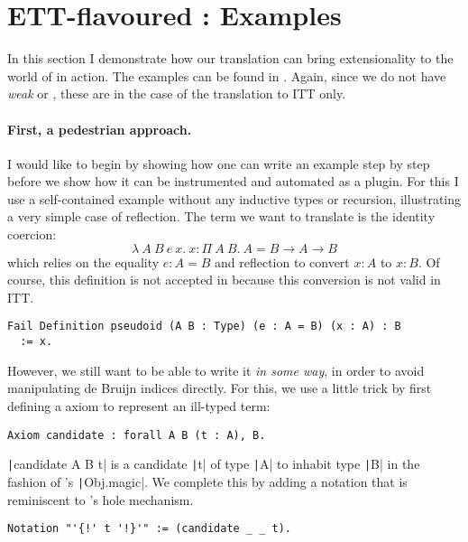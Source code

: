 \section{ETT-flavoured \Coq: Examples}

In this section I demonstrate how our translation can bring extensionality to
the world of \Coq in action. The examples can be found in
.
Again, since we do not have \emph{weak} \Coq or \MetaCoq, these are in the case
of the translation to \acrshort{ITT} only.

\paragraph{First, a pedestrian approach.}
%
I would like to begin by showing how one can write an example step by step
before we show how it can be instrumented and automated as a plugin.
For this I use a self-contained example without any inductive
types or recursion, illustrating a very simple case of reflection.
The term we want to translate is the identity coercion:
\[
  \lambda\ A\ B\ e\ x.\ x : \Pi\ A\ B.\ A = B \to
  A \to B
\]
which relies on the equality \(e : A = B\) and reflection to convert  \(x : A\)
to \(x : B\).
%
Of course, this definition is not accepted in \Coq because this
conversion is not valid in \acrshort{ITT}.
%
\begin{verbatim}
Fail Definition pseudoid (A B : Type) (e : A = B) (x : A) : B
  := x.
\end{verbatim}
%
However, we still want to be able to write it \emph{in some way}, in order to
avoid manipulating de Bruijn indices directly.
%
For this, we use a little trick by first defining a \Coq axiom to represent
an ill-typed term:
%
\begin{verbatim}
Axiom candidate : forall A B (t : A), B.
\end{verbatim}
%
\texttt|candidate A B t| is a candidate \texttt|t| of type
\texttt|A| to inhabit type \texttt|B| in the fashion of
\ocaml's \texttt|Obj.magic|.
We complete this by adding a notation that is reminiscent to \Agda's hole
mechanism.
%
\begin{verbatim}
Notation "'{!' t '!}'" := (candidate _ _ t).
\end{verbatim}

